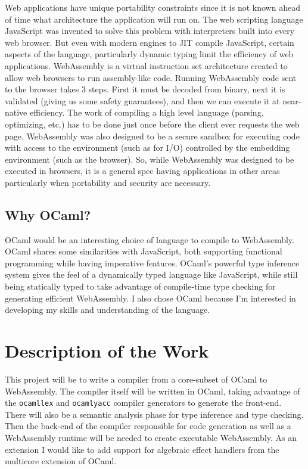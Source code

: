\documentclass[a4paper,12pt]{article}
\begin{document}
Web applications have unique portability constraints since it is not known ahead of time what architecture the application will run on.
The web scripting language JavaScript was invented to solve this problem with interpreters built into every web browser.
But even with modern engines to JIT compile JavaScript, certain aspects of the language, particularly dynamic typing limit the efficiency of web applications.
WebAssembly is a virtual instruction set architecture created to allow web browsers to run assembly-like code.
Running WebAssembly code sent to the browser takes 3 steps.
First it must be decoded from binary, next it is validated (giving us some safety guarantees), and then we can execute it at near-native efficiency.
The work of compiling a high level language (parsing, optimizing, etc.) has to be done just once before the client ever requests the web page.
WebAssembly was also designed to be a secure sandbox for executing code with access to the environment (such as for I/O) controlled by the embedding environment (such as the browser).
So, while WebAssembly was designed to be executed in browsers, it is a general spec having applications in other areas particularly when portability and security are necessary.

\subsection{Why OCaml?}

OCaml would be an interesting choice of language to compile to WebAssembly.
OCaml shares some similarities with JavaScript, both supporting functional programming while having imperative features.
OCaml's powerful type inference system gives the feel of a dynamically typed language like JavaScript, while still being statically typed to take advantage of compile-time type checking for generating efficient WebAssembly.
I also chose OCaml because I'm interested in developing my skills and understanding of the language.

\section{Description of the Work}

This project will be to write a compiler from a core-subset of OCaml to WebAssembly.
The compiler itself will be written in OCaml, taking advantage of the {\tt ocamllex} and {\tt ocamlyacc} compiler generators to generate the front-end.
There will also be a semantic analysis phase for type inference and type checking.
Then the back-end of the compiler responsible for code generation as well as a WebAssembly runtime will be needed to create executable WebAssembly.
As an extension I would like to add support for algebraic effect handlers from the multicore extension of OCaml.
\end{document}
